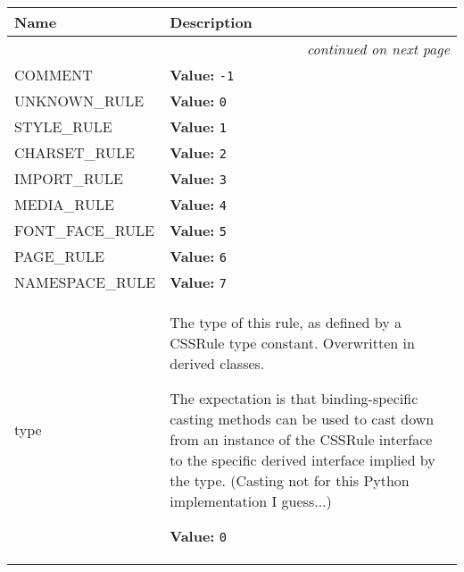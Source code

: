    \vspace{-1cm}
\hspace{\varindent}\begin{longtable}{|p{\varnamewidth}|p{\vardescrwidth}|l}
\cline{1-2}
\cline{1-2} \centering \textbf{Name} & \centering \textbf{Description}& \\
\cline{1-2}
\endhead\cline{1-2}\multicolumn{3}{r}{\small\textit{continued on next page}}\\\endfoot\cline{1-2}
\endlastfoot\raggedright C\-O\-M\-M\-E\-N\-T\- & \raggedright \textbf{Value:} 
{\tt -1}&\\
\cline{1-2}
\raggedright U\-N\-K\-N\-O\-W\-N\-\_\-R\-U\-L\-E\- & \raggedright \textbf{Value:} 
{\tt 0}&\\
\cline{1-2}
\raggedright S\-T\-Y\-L\-E\-\_\-R\-U\-L\-E\- & \raggedright \textbf{Value:} 
{\tt 1}&\\
\cline{1-2}
\raggedright C\-H\-A\-R\-S\-E\-T\-\_\-R\-U\-L\-E\- & \raggedright \textbf{Value:} 
{\tt 2}&\\
\cline{1-2}
\raggedright I\-M\-P\-O\-R\-T\-\_\-R\-U\-L\-E\- & \raggedright \textbf{Value:} 
{\tt 3}&\\
\cline{1-2}
\raggedright M\-E\-D\-I\-A\-\_\-R\-U\-L\-E\- & \raggedright \textbf{Value:} 
{\tt 4}&\\
\cline{1-2}
\raggedright F\-O\-N\-T\-\_\-F\-A\-C\-E\-\_\-R\-U\-L\-E\- & \raggedright \textbf{Value:} 
{\tt 5}&\\
\cline{1-2}
\raggedright P\-A\-G\-E\-\_\-R\-U\-L\-E\- & \raggedright \textbf{Value:} 
{\tt 6}&\\
\cline{1-2}
\raggedright N\-A\-M\-E\-S\-P\-A\-C\-E\-\_\-R\-U\-L\-E\- & \raggedright \textbf{Value:} 
{\tt 7}&\\
\cline{1-2}
\raggedright t\-y\-p\-e\- & \raggedright The type of this rule, as defined by a CSSRule type constant.
Overwritten in derived classes.

The expectation is that binding-specific casting methods can be used to
cast down from an instance of the CSSRule interface to the specific
derived interface implied by the type.
(Casting not for this Python implementation I guess...)

\textbf{Value:} 
{\tt 0}&\\
\cline{1-2}
\end{longtable}


